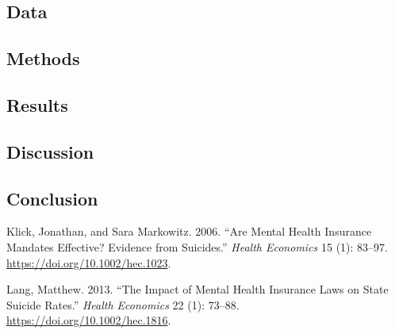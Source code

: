 \documentclass[
  12pt,
]{article}
\newlength{\cslhangindent}
\newlength{\cslentryspacingunit} %
\newenvironment{CSLReferences}[2] %
 {%
  \setlength{\parindent}{0pt}
  \ifodd #1
  \let\oldpar\par
  \def\par{\hangindent=\cslhangindent\oldpar}
  \fi
  \setlength{\parskip}{#2\cslentryspacingunit}
 }%
 {}
\begin{document}
\hypertarget{data}{%
\subsection{Data}\label{data}}

\hypertarget{methods}{%
\subsection{Methods}\label{methods}}

\hypertarget{results}{%
\subsection{Results}\label{results}}

\hypertarget{discussion}{%
\subsection{Discussion}\label{discussion}}

\hypertarget{conclusion}{%
\subsection*{Conclusion}\label{conclusion}}

\hypertarget{refs}{}
\begin{CSLReferences}{1}{0}
\leavevmode{}%
Klick, Jonathan, and Sara Markowitz. 2006. {``Are Mental Health
Insurance Mandates Effective? Evidence from Suicides.''} \emph{Health
Economics} 15 (1): 83--97. \url{https://doi.org/10.1002/hec.1023}.

\leavevmode{}%
Lang, Matthew. 2013. {``The Impact of Mental Health Insurance Laws on
State Suicide Rates.''} \emph{Health Economics} 22 (1): 73--88.
\url{https://doi.org/10.1002/hec.1816}.

\end{CSLReferences}
\end{document}
